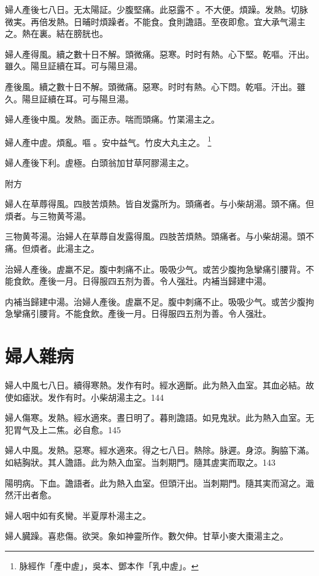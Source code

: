{\khaaitp 婦人}產後七八日。无太陽証。少腹堅痛。此惡露不{\sungtpii 𥁞}。不大便。煩躁。发熱。切脉微実。再倍发熱。日晡时煩躁者。不{\khaaitp 能}食。食則譫語。至夜即愈。宜大承气湯主之。熱在裏。結在膀胱也。{\dengben}

婦人產得風。續之數十日不解。頭微痛。惡寒。时时有熱。心下堅。乾嘔。汗出。雖久。陽旦証續在耳。可与陽旦湯。{\wuben}

產後風。續之數十日不解。頭微痛。惡寒。时时有熱。心下悶。乾嘔。汗出。雖久。陽旦証續在耳。可与陽旦湯。{\dengben}

{\khaaitp 婦人}產後中風。发熱。面{\khaaitp 正}赤。喘而頭痛。竹枼湯主之。

婦人產中虗。煩亂。嘔{\sungtpii 𠱘}。安中益气。竹皮大丸主之。
	\footnote{脉經作「產中虗」，吳本、鄧本作「乳中虗」。}

{\khaaitp 婦人}產後下利。虗極。白頭翁加甘草阿膠湯主之。

附方

婦人在草蓐得風。四肢苦煩熱。皆自发露所为。頭痛者。与小柴胡湯。頭不痛。但煩者。与三物黄芩湯。{\wuben}

三物黄芩湯。治婦人在草蓐自发露得風。四肢苦煩熱。頭痛者。与小柴胡湯。頭不痛。但煩者。此湯主之。{\dengben}

治婦人產後。虗羸不足。腹中刺痛不止。吸吸少气。或苦少腹拘急攣痛引腰背。不能食飲。產後一月。日得服四五剂为善。令人强壯。内補当歸建中湯。{\wuben}

内補当歸建中湯。治婦人產後。虗羸不足。腹中刺痛不止。吸吸少气。或苦少腹拘急攣痛引腰背。不能食飲。產後一月。日得服四五剂为善。令人强壯。{\dengben}

\chapter{婦人雜病}

婦人中風七八日。續得寒熱。发作有时。經水適斷。此为熱入血室。其血必結。故使如瘧狀。发作有时。小柴胡湯主之。144

婦人傷寒。发熱。經水適來。晝日明了。暮則譫語。如見鬼狀。此为熱入血室。无犯胃气及上二焦。必自愈。145

婦人中風。发熱。惡寒。經水適來。得之七八日。熱除。脉遲。身涼。胸脇下滿。如結胸狀。其人譫語。此为熱入血室。当刺期門。隨其{\khaaitp 虗}実而取之。143

陽明病。下血。譫語者。此为熱入血室。但頭汗出。当刺期門。隨其実而瀉之。濈然汗出者愈。

婦人咽中如有炙臠。半夏厚朴湯主之。

婦人臓躁。喜悲傷。欲哭。象如神靈所作。數欠伸。甘草小麥大棗湯主之。

